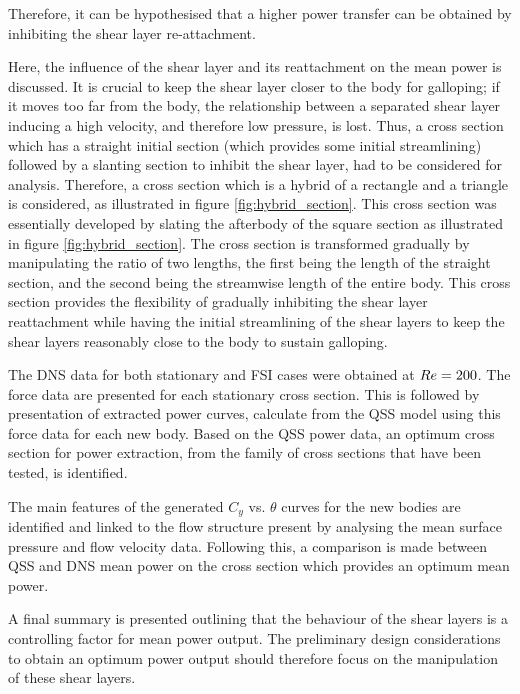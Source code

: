 Therefore, it can be hypothesised that a higher power transfer can be obtained by inhibiting the shear layer re-attachment. 

Here, the influence of the shear layer and its reattachment on the mean power is discussed. It is crucial to keep the shear layer closer to the body for galloping; if it moves too far from the body, the relationship between a separated shear layer inducing a high velocity, and therefore low pressure, is lost. Thus, a cross section which has a straight initial section (which provides some initial streamlining) followed by a slanting section to inhibit the shear layer, had to be considered for analysis. Therefore, a cross section which is a hybrid of a rectangle and a triangle is considered, as illustrated in figure \ref{fig:hybrid_section}. This cross section was essentially developed by slating the afterbody of the square section as illustrated in figure \ref{fig:hybrid_section}. The cross section is transformed gradually by manipulating the ratio of two lengths, the first being the length of the straight section, and the second being the streamwise length of the entire body. This cross section provides the flexibility of gradually inhibiting the shear layer reattachment while having the initial streamlining of the shear layers to keep the shear layers reasonably close to the body to sustain galloping. 

The DNS data for both stationary and FSI cases were obtained at $Re=200$. The force data are presented for each stationary cross section. This is followed by presentation of extracted power curves, calculate from the QSS model using this force data for each new body. Based on the QSS power data, an optimum cross section for power extraction, from the family of cross sections that have been tested, is identified.

The main features of the generated $C_y$ vs. $\theta$ curves for the
new bodies are identified and linked to the flow structure present by
analysing the mean surface pressure and flow velocity data. Following
this, a comparison is made between QSS and DNS mean power on the cross
section which provides an optimum mean power.

A final summary is presented outlining that the behaviour of the shear layers is a controlling factor for mean power output. The preliminary design considerations to obtain an optimum power output should therefore focus on the manipulation of these shear layers. 






